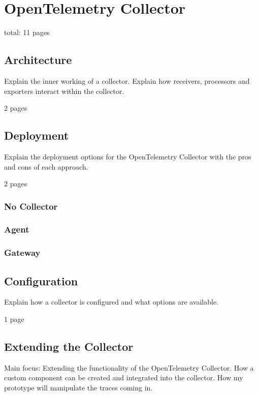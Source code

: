 \chapter{OpenTelemetry Collector}
\label{chap:collector}

total: 11 pages

\section{Architecture}
\label{sec:c_architecture}

Explain the inner working of a collector.
Explain how receivers, processors and exporters interact within the collector.

2 pages

\section{Deployment}
\label{sec:c_deployment}

Explain the deployment options for the OpenTelemetry Collector with the pros and cons of each approach.

2 pages

\subsection{No Collector}
\subsection{Agent}
\subsection{Gateway}

\section{Configuration}
\label{sec:c_configuration}

Explain how a collector is configured and what options are available.

1 page

\section{Extending the Collector}
\label{sec:c_extending_the_collector}

Main focus: Extending the functionality of the OpenTelemetry Collector.
How a custom component can be created and integrated into the collector.
How my prototype will manipulate the traces coming in.

